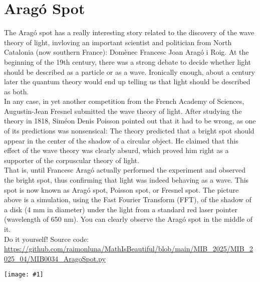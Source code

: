 \documentclass[12pt,landscape]{article}
\newcommand{\artpage}[3][]{%
  \begin{minipage}[t]{0.48\linewidth}
    \vspace{0pt} %
    \section*{#2} %
    \addcontentsline{toc}{section}{#2} %
    #3 %
  \end{minipage}%
  \hfill
  \begin{minipage}[t]{0.48\linewidth}
    \vspace{0pt} %
    \centering
    \texttt{[image: \#1]}
  \end{minipage}%
  \newpage
}
\begin{document}
\artpage[../Output/LowQuality/MIB0034_AragoSpot.png]{Aragó Spot}{%
The Aragó spot has a really interesting story related to the discovery of the wave theory of light, invloving an important scientist and politician from North Catalonia (now southern France): Domènec Francesc Joan Aragó i Roig. At the beginning of the 19th century, there was a strong debate to decide whether light should be described as a particle or as a wave. Ironically enough, about a century later the quantum theory would end up telling us that light should be described as both. \\

In any case, in yet another competition from the French Academy of Sciences, Augustin-Jean Fresnel submitted the wave theory of light. After studying the theory in 1818, Siméon Denis Poisson pointed out that it had to be wrong, as one of its predictions was nonsensical: The theory predicted that a bright spot should appear in the center of the shadow of a circular object. He claimed that this effect of the wave theory was clearly absurd, which proved him right as a supporter of the corpuscular theory of light.\\

That is, until Francesc Aragó actually performed the experiment and observed the bright spot, thus confirming that light was indeed behaving as a wave. This spot is now known as Aragó spot, Poisson spot, or Fresnel spot. The picture above is a simulation, using the Fast Fourier Transform (FFT), of the shadow of a disk (4 mm in diameter) under the light from a standard red laser pointer (wavelength of 650 nm). You can clearly observe the Aragó spot in the middle of it.\\

Do it yourself! Source code: \url{https://github.com/raimonluna/MathIsBeautiful/blob/main/MIB_2025/MIB_2025_04/MIB0034_AragoSpot.py}
}
\end{document}
